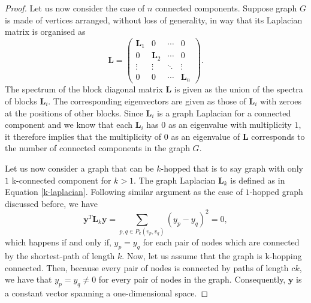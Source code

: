 \documentclass[10pt,a4paper]{article}
\begin{document}
\begin{proof}
    	    	Let us now consider the case of $n$ connected components. Suppose graph $G$ is made of vertices arranged, without loss of generality, in way that its Laplacian matrix is organised as 
    	    	\begin{equation*}
    	    	\mathbf{L} = \begin{pmatrix}
    	    	\mathbf{L}_{1} & 0 & \cdots & 0 \\
    	    	0 & \mathbf{L}_{2} & \cdots & 0\\
    	    	\vdots& \vdots & \ddots & \vdots \\
    	    	0 & 0 & \cdots & \mathbf{L}_{n}
    	    	\end{pmatrix}.
    	    	\end{equation*}
    	    	The spectrum of the block diagonal matrix $\mathbf{L}$ is given as the union of the spectra of blocks $\mathbf{L}_i$. The corresponding eigenvectors are given as those of $\mathbf{L}_i$ with zeroes at the positions of other blocks.
    	    	Since $\mathbf{L}_i$ is a graph Laplacian for a connected component and we know that each $\mathbf{L}_i$ has $0$ as an eigenvalue with multiplicity $1$, it therefore implies that the multiplicity of $0$ as an eigenvalue of $\mathbf{L}$ corresponds to the number of connected components in the graph $G$. %
    	    	
    	    	Let us now consider a graph that can be $k$-hopped that is to say graph with only $1$ k-connected component for $k>1$. The graph Laplacian $\mathbf{L}_k$ is defined as in Equation \ref{k-laplacian}. Following similar argument as the case of $1$-hopped graph discussed before, we have
    	    	\begin{equation}
    	    	\mathbf{y}^T \mathbf{L}_k \mathbf{y} = \sum_{p,q \in P_k(v_p,v_q)} (y_p-y_q)^2 = 0,  
    	    	\end{equation} 		
    	    	which happens if and only if, $y_p =y_q$ for each pair of nodes which are connected by the shortest-path of length $k$. Now, let us assume that the graph is k-hopping connected. Then, because every pair of nodes is connected by paths of length $ck$, we have that $y_p =y_q \neq 0$ for every pair of nodes in the graph. Consequently, $\mathbf{y}$ is a constant vector spanning a one-dimensional space.
    	    	

\end{proof}
\end{document}
